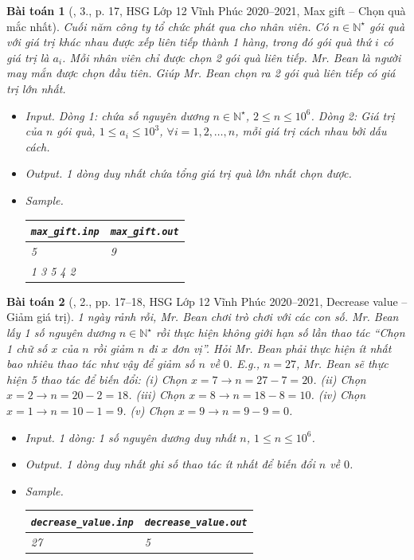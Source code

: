 \documentclass{article}
\newtheorem{baitoan}{Bài toán}
\begin{document}
\begin{baitoan}[\cite{Trung_HSG_THPT_Tin}, 3., p. 17, HSG Lớp 12 Vĩnh Phúc 2020--2021, Max gift -- Chọn quà mắc nhất]
	Cuối năm công ty tổ chức phát qua cho nhân viên. Có $n\in\mathbb{N}^\star$ gói quà với giá trị khác nhau được xếp liên tiếp thành 1 hàng, trong đó gói quà thứ $i$ có giá trị là $a_i$. Mỗi nhân viên chỉ được chọn 2 gói quà liên tiếp. Mr. Bean là người may mắn được chọn đầu tiên. Giúp Mr. Bean chọn ra 2 gói quà liên tiếp có giá trị lớn nhất.
	\begin{itemize}
		\item {\sf Input.} Dòng 1: chứa số nguyên dương $n\in\mathbb{N}^\star$, $2\le n\le10^6$. Dòng 2: Giá trị của $n$ gói quà, $1\le a_i\le10^3$, $\forall i = 1,2,\ldots,n$, mỗi giá trị cách nhau bởi dấu cách.
		\item {\sf Output.} 1 dòng duy nhất chứa tổng giá trị quà lớn nhất chọn được.
		\item {\sf Sample.}
		\begin{table}[H]
			\centering
			\begin{tabular}{|l|l|}
				\hline
				\verb|max_gift.inp| & \verb|max_gift.out| \\
				\hline
				5 & 9 \\
				1 3 5 4 2 &  \\
				\hline
			\end{tabular}
		\end{table}
	\end{itemize}
\end{baitoan}

\begin{baitoan}[\cite{Trung_HSG_THPT_Tin}, 2., pp. 17--18, HSG Lớp 12 Vĩnh Phúc 2020--2021, Decrease value -- Giảm giá trị]
	1 ngày rảnh rỗi, Mr. Bean chơi trò chơi với các con số. Mr. Bean lấy 1 số nguyên dương $n\in\mathbb{N}^\star$ rồi thực hiện không giới hạn số lần thao tác ``Chọn 1 chữ số $x$ của $n$ rồi giảm $n$ đi $x$ đơn vị''. Hỏi Mr. Bean phải thực hiện ít nhất bao nhiêu thao tác như vậy để giảm số $n$ về $0$. E.g., $n = 27$, Mr. Bean sẽ thực hiện 5 thao tác để biến đổi: (i) Chọn $x = 7\to n = 27 - 7 = 20$. (ii) Chọn $x = 2\to n = 20 - 2 = 18$. (iii) Chọn $x = 8\to n = 18 - 8 = 10$. (iv) Chọn $x = 1\to n = 10 - 1 = 9$. (v) Chọn $x = 9\to n = 9 - 9 = 0$.
	\begin{itemize}
		\item {\sf Input.} 1 dòng: 1 số nguyên dương duy nhất $n$, $1\le n\le10^6$.
		\item {\sf Output.} 1 dòng duy nhất ghi số thao tác ít nhất để biến đổi $n$ về $0$.
		\item {\sf Sample.}
		\begin{table}[H]
			\centering
			\begin{tabular}{|l|l|}
				\hline
				\verb|decrease_value.inp| & \verb|decrease_value.out| \\
				\hline
				27 & 5 \\
				\hline
			\end{tabular}
		\end{table}
	\end{itemize}
\end{baitoan}
\end{document}
